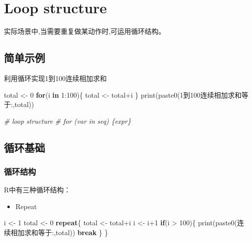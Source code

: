 \documentclass[
]{book}
\newenvironment{Shaded}{\begin{snugshade}}{\end{snugshade}}
\newcommand{\CommentTok}[1]{\textcolor[rgb]{0.56,0.35,0.01}{\textit{#1}}}
\newcommand{\ControlFlowTok}[1]{\textcolor[rgb]{0.13,0.29,0.53}{\textbf{#1}}}
\newcommand{\DecValTok}[1]{\textcolor[rgb]{0.00,0.00,0.81}{#1}}
\newcommand{\FunctionTok}[1]{\textcolor[rgb]{0.00,0.00,0.00}{#1}}
\newcommand{\NormalTok}[1]{#1}
\newcommand{\OtherTok}[1]{\textcolor[rgb]{0.56,0.35,0.01}{#1}}
\newcommand{\SpecialCharTok}[1]{\textcolor[rgb]{0.00,0.00,0.00}{#1}}
\newcommand{\StringTok}[1]{\textcolor[rgb]{0.31,0.60,0.02}{#1}}
\providecommand{\tightlist}{%
  \setlength{\itemsep}{0pt}\setlength{\parskip}{0pt}}
\begin{document}
\hypertarget{loop-structure}{%
\chapter{Loop structure}\label{loop-structure}}

实际场景中,当需要重复做某动作时,可运用循环结构。

\hypertarget{ux7b80ux5355ux793aux4f8b}{%
\section{简单示例}\label{ux7b80ux5355ux793aux4f8b}}

利用循环实现1到100连续相加求和

\begin{Shaded}
\begin{Highlighting}[]
\NormalTok{total }\OtherTok{\textless{}{-}} \DecValTok{0}
\ControlFlowTok{for}\NormalTok{(i }\ControlFlowTok{in} \DecValTok{1}\SpecialCharTok{:}\DecValTok{100}\NormalTok{)\{}
\NormalTok{  total }\OtherTok{\textless{}{-}}\NormalTok{ total}\SpecialCharTok{+}\NormalTok{i}
\NormalTok{\}}
\FunctionTok{print}\NormalTok{(}\FunctionTok{paste0}\NormalTok{(}\StringTok{\textquotesingle{}1到100连续相加求和等于:\textquotesingle{}}\NormalTok{,total))}

\CommentTok{\# loop structure}
\CommentTok{\# for (var in seq) \{expr\}}
\end{Highlighting}
\end{Shaded}

\hypertarget{ux5faaux73afux57faux7840}{%
\section{循环基础}\label{ux5faaux73afux57faux7840}}

\hypertarget{ux5faaux73afux7ed3ux6784}{%
\subsection{循环结构}\label{ux5faaux73afux7ed3ux6784}}

R中有三种循环结构：

\begin{itemize}
\tightlist
\item
  Repeat
\end{itemize}

\begin{Shaded}
\begin{Highlighting}[]
\NormalTok{i }\OtherTok{\textless{}{-}} \DecValTok{1}
\NormalTok{total }\OtherTok{\textless{}{-}} \DecValTok{0}
\ControlFlowTok{repeat}\NormalTok{\{}
\NormalTok{  total }\OtherTok{\textless{}{-}}\NormalTok{ total}\SpecialCharTok{+}\NormalTok{i}
\NormalTok{  i }\OtherTok{\textless{}{-}}\NormalTok{ i}\SpecialCharTok{+}\DecValTok{1}
  \ControlFlowTok{if}\NormalTok{(i }\SpecialCharTok{\textgreater{}} \DecValTok{100}\NormalTok{)\{}
    \FunctionTok{print}\NormalTok{(}\FunctionTok{paste0}\NormalTok{(}\StringTok{\textquotesingle{}连续相加求和等于:\textquotesingle{}}\NormalTok{,total))}
    \ControlFlowTok{break}
\NormalTok{  \}}
\NormalTok{\}}
\end{Highlighting}
\end{Shaded}
\end{document}
